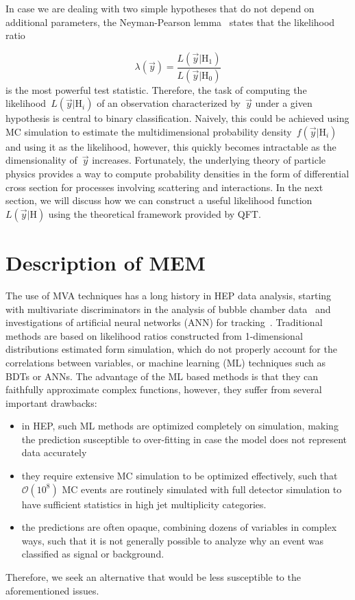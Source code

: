 In case we are dealing with two simple hypotheses that do not depend on additional parameters, the Neyman-Pearson lemma~\cite{neyman1992problem} states that the likelihood ratio

\begin{equation}
\lambda(\vec{y}) = \frac{L(\vec{y}|\mathrm{H}_1)}{L(\vec{y}|\mathrm{H}_0)}
\end{equation}
is the most powerful test statistic. Therefore, the task of computing the likelihood~$L(\vec{y}|\mathrm{H}_i)$ of an observation characterized by~$\vec{y}$ under a given hypothesis is central to binary classification. Naively, this could be achieved using MC simulation to estimate the multidimensional probability density~$f(\vec{y}|\mathrm{H}_i)$ and using it as the likelihood, however, this quickly becomes intractable as the dimensionality of~$\vec{y}$ increases. Fortunately, the underlying theory of particle physics provides a way to compute probability densities in the form of differential cross section for processes involving scattering and interactions. In the next section, we will discuss how we can construct a useful likelihood function~$L(\vec{y}|\mathrm{H})$ using the theoretical framework provided by QFT.

\section{Description of MEM}

The use of MVA techniques has a long history in HEP data analysis, starting with multivariate discriminators in the analysis of bubble chamber data~\cite{VanDoninck:1984wd} and investigations of artificial neural networks (ANN) for tracking~\cite{Denby:1987rk}. Traditional methods are based on likelihood ratios constructed from 1-dimensional distributions estimated form simulation, which do not properly account for the correlations between variables, or machine learning (ML) techniques such as BDTs or ANNs. The advantage of the ML based methods is that they can faithfully approximate complex functions, however, they suffer from several important drawbacks:

\begin{itemize}
\item in HEP, such ML methods are optimized completely on simulation, making the prediction susceptible to over-fitting in case the model does not represent data accurately
\item they require extensive MC simulation to be optimized effectively, such that $\mathcal{O}(10^8)$ MC events are routinely simulated with full detector simulation to have sufficient statistics in high jet multiplicity categories.
\item the predictions are often opaque, combining dozens of variables in complex ways, such that it is not generally possible to analyze why an event was classified as signal or background.
\end{itemize}
Therefore, we seek an alternative that would be less susceptible to the aforementioned issues.

